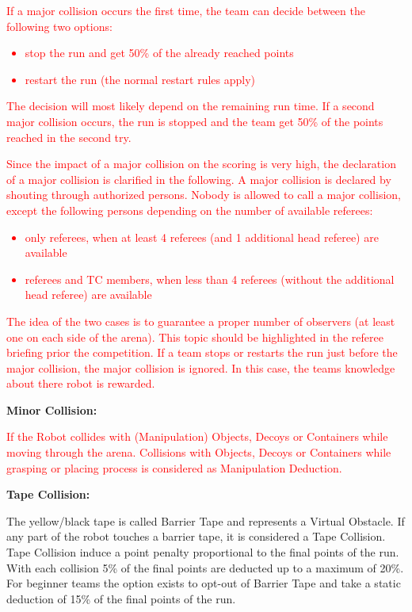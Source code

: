\textcolor{red}{If a major collision occurs the first time, the team can decide between the following two options:
\begin{itemize}
	\item stop the run and get 50\% of the already reached points
	\item restart the run (the normal restart rules apply)
\end{itemize}
The decision will most likely depend on the remaining run time. If a second major collision occurs, the run is stopped and the team get 50\% of the points reached in the second try.
}

\textcolor{red}{Since the impact of a major collision on the scoring is very high, the declaration of a major collision is clarified in the following. A major collision is declared by shouting through authorized persons. Nobody is allowed to call a major collision, except the following persons depending on the number of available referees:
\begin{itemize}
	\item only referees, when at least 4 referees (and 1 additional head referee) are available
	\item referees and TC members, when less than 4 referees (without the additional head referee) are available
\end{itemize}
The idea of the two cases is to guarantee a proper number of observers (at least one on each side of the arena). This topic should be highlighted in the referee briefing prior the competition. If a team stops or restarts the run just before the major collision, the major collision is ignored. In this case, the teams knowledge about there robot is rewarded.}


\textbf{Minor Collision:}

\textcolor{red}{If the Robot collides with (Manipulation) Objects, Decoys or Containers while moving through the arena. Collisions with Objects, Decoys or Containers while grasping or placing process is considered as Manipulation Deduction. }


\textbf{Tape Collision:}

The yellow/black tape is called Barrier Tape and represents a Virtual Obstacle. If any part of the robot
touches a barrier tape, it is considered a Tape Collision. Tape Collision induce a point penalty
proportional to the final points of the run. With each collision 5\% of the final points are deducted up to a maximum
of 20\%. For beginner teams the option exists to opt-out of Barrier Tape and take a static deduction of 15\% of the
final points of the run.

